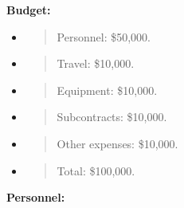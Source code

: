 \textbf{Budget:}

\begin{itemize}
\item
  \begin{quote}
  Personnel: \$50,000.
  \end{quote}
\item
  \begin{quote}
  Travel: \$10,000.
  \end{quote}
\item
  \begin{quote}
  Equipment: \$10,000.
  \end{quote}
\item
  \begin{quote}
  Subcontracts: \$10,000.
  \end{quote}
\item
  \begin{quote}
  Other expenses: \$10,000.
  \end{quote}
\item
  \begin{quote}
  Total: \$100,000.
  \end{quote}
\end{itemize}

\textbf{Personnel:}

